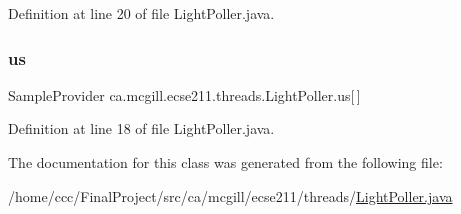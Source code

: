Definition at line 20 of file Light\+Poller.\+java.

\mbox{\label{classca_1_1mcgill_1_1ecse211_1_1threads_1_1_light_poller_ab6a9cb770bbf71f586697633db1475ff}} 
\subsubsection{\texorpdfstring{us}{us}}
{\footnotesize\ttfamily Sample\+Provider ca.\+mcgill.\+ecse211.\+threads.\+Light\+Poller.\+us\mbox{[}$\,$\mbox{]}\hspace{0.3cm}{\ttfamily [protected]}}



Definition at line 18 of file Light\+Poller.\+java.



The documentation for this class was generated from the following file\+:\begin{DoxyCompactItemize}
\item 
/home/ccc/\+Final\+Project/src/ca/mcgill/ecse211/threads/\hyperlink{_light_poller_8java}{Light\+Poller.\+java}\end{DoxyCompactItemize}
